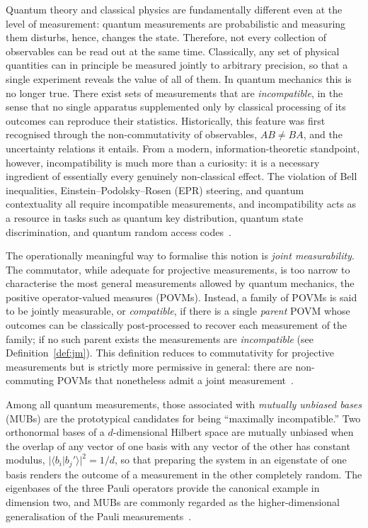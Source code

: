 \documentclass[oneside, a4paper, onecolumn, 11pt]{article}
\theoremstyle{definition}
\theoremstyle{plain}
\theoremstyle{remark}
\begin{document}
Quantum theory and classical physics are fundamentally different even at the level of
measurement: quantum measurements are probabilistic and measuring them disturbs, hence, changes the state. Therefore, not every collection of observables can be read out at the same
time. Classically, any set of physical quantities can in principle be measured
jointly to arbitrary precision, so that a single experiment reveals the value
of all of them. In quantum mechanics this is no longer true. There exist sets
of measurements that are \emph{incompatible}, in the sense that no single
apparatus supplemented only by classical processing of its outcomes can
reproduce their statistics. Historically, this feature was first recognised
through the non-commutativity of observables, $AB \neq BA$, and the uncertainty
relations it entails. From a modern, information-theoretic standpoint, however,
incompatibility is much more than a curiosity: it is a necessary ingredient of
essentially every genuinely non-classical effect. The violation of Bell
inequalities, Einstein--Podolsky--Rosen (EPR) steering, and quantum
contextuality all require incompatible measurements, and incompatibility acts
as a resource in tasks such as quantum key distribution, quantum state
discrimination, and quantum random access codes~\cite{Quintino2019,Guhne2023}.
 
The operationally meaningful way to formalise this notion is
\emph{joint measurability}. The commutator, while adequate for projective
measurements, is too narrow to characterise the most general measurements
allowed by quantum mechanics, the positive operator-valued measures (POVMs).
Instead, a family of POVMs is said to be jointly measurable, or
\emph{compatible}, if there is a single \emph{parent} POVM whose outcomes can be
classically post-processed to recover each measurement of the family; if no such
parent exists the measurements are \emph{incompatible}
(see Definition~\ref{def:jm}). This definition reduces to
commutativity for projective measurements but is strictly more permissive in
general: there are non-commuting POVMs that nonetheless admit a joint
measurement~\cite{Guhne2023}.
 
Among all quantum measurements, those associated with \emph{mutually unbiased
bases} (MUBs) are the prototypical candidates for being ``maximally
incompatible.'' Two orthonormal bases of a $d$-dimensional Hilbert space are
mutually unbiased when the overlap of any vector of one basis with any vector of
the other has constant modulus, $|\langle b_i | b_j' \rangle|^2 = 1/d$, so that
preparing the system in an eigenstate of one basis renders the outcome of a
measurement in the other completely random. The eigenbases of the three Pauli
operators provide the canonical example in dimension two, and MUBs are commonly
regarded as the higher-dimensional generalisation of the Pauli
measurements~\cite{Designolle2019}.
 
\end{document}
